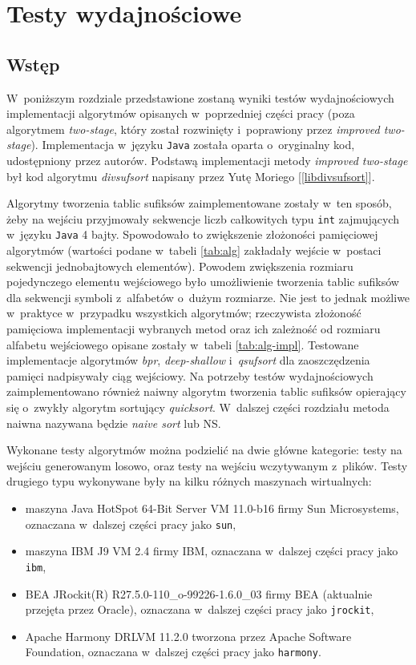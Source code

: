 \chapter{Testy wydajnościowe}

\section{Wstęp}
 
W~poniższym rozdziale przedstawione zostaną wyniki testów wydajnościowych implementacji algorytmów
opisanych w~poprzedniej części pracy (poza algorytmem \emph{two-stage}, który został rozwinięty
i~poprawiony przez \emph{improved two-stage}). Implementacja w~języku \texttt{Java} została oparta
o~oryginalny kod, udostępniony przez autorów. Podstawą implementacji metody \emph{improved
two-stage} był kod algorytmu \emph{divsufsort} napisany przez Yutę Moriego [\ref{libdivsufsort}].

Algorytmy tworzenia tablic sufiksów zaimplementowane zostały w~ten sposób, żeby na wejściu
przyjmowały sekwencje liczb całkowitych typu \texttt{int} zajmujących w~języku \texttt{Java} 4
bajty. Spowodowało to zwiększenie złożoności pamięciowej algorytmów (wartości podane w~tabeli
\ref{tab:alg} zakładały wejście w~postaci sekwencji jednobajtowych elementów). Powodem zwiększenia
rozmiaru pojedynczego elementu wejściowego było umożliwienie tworzenia tablic sufiksów dla sekwencji
symboli z~alfabetów o~dużym rozmiarze. Nie jest to jednak możliwe w~praktyce w~przypadku wszystkich
algorytmów; rzeczywista złożoność pamięciowa implementacji wybranych metod oraz ich zależność od
rozmiaru alfabetu wejściowego opisane zostały w~tabeli \ref{tab:alg-impl}. Testowane implementacje
algorytmów \emph{bpr}, \emph{deep-shallow} i~\emph{qsufsort} dla zaoszczędzenia pamięci nadpisywały
ciąg wejściowy. Na potrzeby testów wydajnościowych zaimplementowano również naiwny algorytm
tworzenia tablic sufiksów opierający się o~zwykły algorytm sortujący \emph{quicksort}. W~dalszej
części rozdziału metoda naiwna nazywana będzie \emph{naive sort} lub NS.

Wykonane testy algorytmów można podzielić na dwie główne kategorie: testy na wejściu generowanym
losowo, oraz testy na wejściu wczytywanym z~plików. Testy drugiego typu wykonywane były na kilku
różnych maszynach wirtualnych:

\begin{itemize}
    \item maszyna Java HotSpot 64-Bit Server VM 11.0-b16 firmy Sun Microsystems, oznaczana w~dalszej części pracy jako \texttt{sun},
    \item maszyna IBM J9 VM 2.4 firmy IBM, oznaczana w~dalszej części pracy jako \texttt{ibm},
    \item BEA JRockit(R) R27.5.0-110\_o-99226-1.6.0\_03 firmy BEA (aktualnie przejęta przez Oracle), oznaczana w~dalszej części pracy jako \texttt{jrockit},
    \item Apache Harmony DRLVM 11.2.0 tworzona przez Apache Software Foundation, oznaczana w~dalszej części pracy jako \texttt{harmony}.
\end{itemize} 

